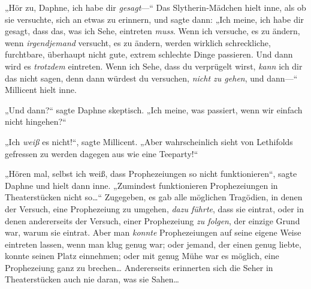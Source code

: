 „Hör zu, Daphne, ich habe dir \emph{gesagt}—“ Das Slytherin-Mädchen hielt inne, als ob sie versuchte, sich an etwas zu erinnern, und sagte dann: „Ich meine, ich habe dir gesagt, dass das, was ich Sehe, eintreten \emph{muss}. Wenn ich versuche, es zu ändern, wenn \emph{irgendjemand} versucht, es zu ändern, werden wirklich schreckliche, furchtbare, überhaupt nicht gute, extrem schlechte Dinge passieren. Und dann wird es \emph{trotzdem} eintreten. Wenn ich Sehe, dass du verprügelt wirst, \emph{kann} ich dir das nicht sagen, denn dann würdest du versuchen, \emph{nicht zu gehen}, und dann—“ Millicent hielt inne.

„Und dann?“ sagte Daphne skeptisch. „Ich meine, was passiert, wenn wir einfach nicht hingehen?“

„Ich \emph{weiß} es nicht!“, sagte Millicent. „Aber wahrscheinlich sieht von Lethifolds gefressen zu werden dagegen aus wie eine Teeparty!“

„Hören mal, selbst ich weiß, dass Prophezeiungen so nicht funktionieren“, sagte Daphne und hielt dann inne. „Zumindest funktionieren Prophezeiungen in Theaterstücken nicht so…“ Zugegeben, es gab alle möglichen Tragödien, in denen der Versuch, eine Prophezeiung zu umgehen, \emph{dazu führte}, dass sie eintrat, oder in denen andererseits der Versuch, einer Prophezeiung \emph{zu folgen}, der einzige Grund war, warum sie eintrat. Aber man \emph{konnte} Prophezeiungen auf seine eigene Weise eintreten lassen, wenn man klug genug war; oder jemand, der einen genug liebte, konnte seinen Platz einnehmen; oder mit genug Mühe war es möglich, eine Prophezeiung ganz zu brechen… Andererseits erinnerten sich die Seher in Theaterstücken auch nie daran, was sie Sahen…


